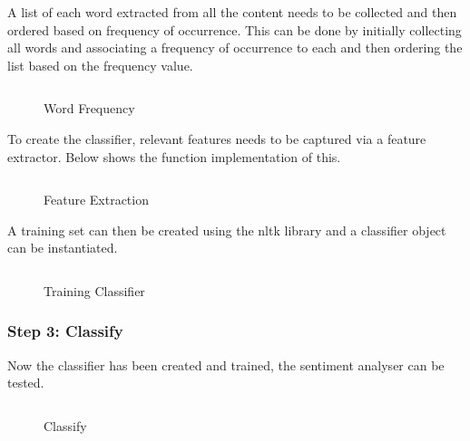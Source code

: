 A list of each word extracted from all the content needs to be collected and then ordered based on frequency of occurrence. This can be done by initially collecting all words and associating a frequency of occurrence to each and then ordering the list based on the frequency value. 

\begin{figure}
  \centering
  \begin{minipage}{14cm}
    \centering
    \inputminted[fontsize=\footnotesize]{python}{inc/snippets/classifier.py}
    \caption{Word Frequency}
    \label{fig:sentiment_analysis_step2a}
  \end{minipage}
\end{figure}

To create the classifier, relevant features needs to be captured via a feature extractor. Below shows the function implementation of this.

\begin{figure}
  \centering
  \begin{minipage}{14cm}
    \centering
    \inputminted[fontsize=\footnotesize]{python}{inc/snippets/classifierB.py}
    \caption{Feature Extraction}
    \label{fig:sentiment_analysis_step2b}
  \end{minipage}
\end{figure}

A training set can then be created using the nltk library and a classifier object can be instantiated.

\begin{figure}
  \centering
  \begin{minipage}{14cm}
    \centering
    \inputminted[fontsize=\footnotesize]{python}{inc/snippets/classifierC.py}
    \caption{Training Classifier}
    \label{fig:sentiment_analysis_step2b}
  \end{minipage}
\end{figure}

\subsubsection{Step 3: Classify}

Now the classifier has been created and trained, the sentiment analyser can be tested.

\begin{figure}
  \centering
  \begin{minipage}{14cm}
    \centering
    \inputminted[fontsize=\footnotesize]{python}{inc/snippets/classify.py}
    \caption{Classify}
    \label{fig:sentiment_analysis_step2b}
  \end{minipage}
\end{figure}

